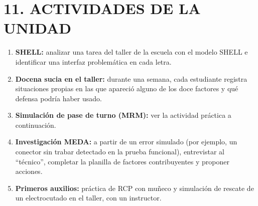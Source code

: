 \section*{11. ACTIVIDADES DE LA UNIDAD}
\begin{enumerate}
  \item \textbf{SHELL:} analizar una tarea del taller de la escuela con el modelo SHELL e
        identificar una interfaz problemática en cada letra.
  \item \textbf{Docena sucia en el taller:} durante una semana, cada estudiante registra situaciones
        propias en las que apareció alguno de los doce factores y qué defensa podría haber usado.
  \item \textbf{Simulación de pase de turno (MRM):} ver la actividad práctica a continuación.
  \item \textbf{Investigación MEDA:} a partir de un error simulado (por ejemplo, un conector sin
        trabar detectado en la prueba funcional), entrevistar al ``técnico'', completar la planilla
        de factores contribuyentes y proponer acciones.
  \item \textbf{Primeros auxilios:} práctica de RCP con muñeco y simulación de rescate de un
        electrocutado en el taller, con un instructor.
\end{enumerate}

